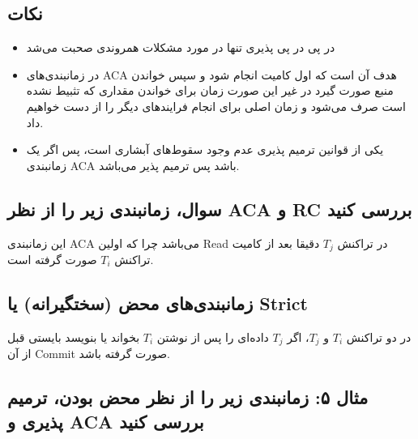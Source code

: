 \documentclass[a4paper]{article}
\begin{document}
\subsection*{نکات}

\begin{itemize}
    \item در پی در پی پذیری تنها در مورد مشکلات همروندی صحبت می‌شد
    \item در زمانبندی‌های ACA هدف آن است که اول کامیت انجام شود و سپس خواندن
    منبع صورت گیرد در غیر این صورت زمان برای خواندن مقداری که تثبیط نشده است صرف
    می‌شود و زمان اصلی برای انجام فرایند‌های دیگر را از دست خواهیم داد.
    \item یکی از قوانین ترمیم پذیری عدم وجود سقوط‌های آبشاری است، پس اگر یک
    زمانبندی ACA باشد پس ترمیم پذیر می‌باشد.
\end{itemize}

\subsection*{سوال، زمانبندی زیر را از نظر ACA و RC بررسی کنید}

\begin{LTR}
    \begin{table}[h]
        \centering
        \begin{RTL}
            \caption{بررسی زمانبندی مثال ۴}
        \end{RTL}
    \end{table}
\end{LTR}

این زمانبندی ACA می‌باشد چرا که اولین Read در تراکنش $T_j$ دقیقا بعد از کامیت
تراکنش $T_i$ صورت گرفته است.

\subsection{زمانبندی‌های محض (سختگیرانه) یا Strict}

در دو تراکنش $T_{i}$ و $T_{j}$، اگر $T_{j}$ داده‌ای را پس از نوشتن $T_{i}$
بخواند یا بنویسد بایستی قبل از آن Commit صورت گرفته باشد.

\subsection*{مثال ۵: زمانبندی زیر را از نظر محض بودن، ترمیم پذیری و ACA بررسی کنید}
\end{document}
